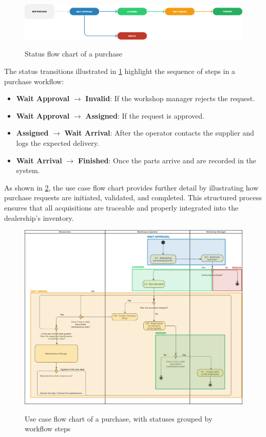\begin{figure}[h]
  \caption{Status flow chart of a purchase}
  \centering
  \includegraphics[width=\textwidth]{figs/Status/Purchase/StatusDiagram}
  \label{fig:purchaseFlowChart}
\end{figure}

The status transitions illustrated in \ref{fig:purchaseFlowChart} highlight the sequence of steps in a purchase workflow:
\begin{itemize}
\item \textbf{Wait Approval} $\rightarrow$ \textbf{Invalid}: If the workshop manager rejects the request.
\item \textbf{Wait Approval} $\rightarrow$ \textbf{Assigned}: If the request is approved.
\item \textbf{Assigned} $\rightarrow$ \textbf{Wait Arrival}: After the operator contacts the supplier and logs the expected delivery.
\item \textbf{Wait Arrival} $\rightarrow$ \textbf{Finished}: Once the parts arrive and are recorded in the system.
\end{itemize}


As shown in \ref{fig:purchaseUseCase}, the use case flow chart provides further detail by illustrating how purchase requests are initiated, validated, and completed. This structured process ensures that all acquisitions are traceable and properly integrated into the dealership's inventory.

\begin{figure}[h]
  \caption{Use case flow chart of a purchase, with statuses grouped by workflow steps}
  \centering
  \includegraphics[width=\textwidth]{figs/Status/Purchase/UseCaseStatus}
  \label{fig:purchaseUseCase}
\end{figure}


